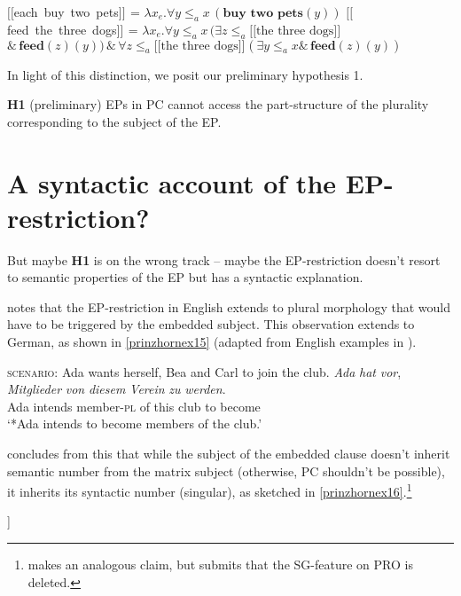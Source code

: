 \documentclass[output=paper,colorlinks,citecolor=brown,
]{langscibook}
\newcommand{\sem}[2]{\mbox{$[\![${#2}$]\!]^{#1}$}} %
\begin{document}
\ea	 
\ea \sem{}{each buy two pets} = $\lambda x_{e}. \forall y \le_{a} x \,(\textbf{buy two pets}(y))$\label{prinzhornex13a}
\ex	 \sem{}{feed the three dogs} = $\lambda x_{e}. \forall y \le_{a} x \,(\exists z \le_{a} \sem{}{the three dogs}$\\$ \&\,\textbf{feed}(z)(y)) \,\&\, \forall z \le_{a} \sem{}{the three dogs} (\exists y \le_{a} x \&\, \textbf{feed}(z)(y))$\label{prinzhornmy13}
\z\z

In light of this distinction, we posit our preliminary hypothesis 1.


\ea \textbf{H1} (preliminary) \quad EPs in PC cannot access the part-structure of the plurality corresponding to the subject of the EP.\label{prinzhornex14}
\z 




\section{A syntactic account of the EP-restriction?}\label{prinzhornsec:3}

But maybe \textbf{H1} is on the wrong track -- maybe the EP-restriction doesn't resort to semantic properties of the EP but has a syntactic explanation. 

\cite{Landau:2000} notes that the EP-restriction in English extends to plural morphology that would have to be triggered by  the embedded subject. This observation extends to German, as shown in \ref{prinzhornex15} (adapted from English examples in \citealt{Landau:2000}).


\ea \label{prinzhornex15}
\ea \textsc{scenario:} Ada wants herself, Bea and Carl to join the club.
\ex \gll *\textit{Ada} \textit{hat} \textit{vor}, \textit{Mitglieder} \textit{von} \textit{diesem} \textit{Verein} \textit{zu} \textit{werden}.\\
   Ada intends {}  member-\textsc{pl} of this club to become \\
   \glt `*Ada intends to become members of the club.' 
   \z\z



\cite{Landau:2000} concludes from this that while the subject of the embedded clause doesn't inherit semantic number from the matrix subject (otherwise, PC shouldn't be possible), it inherits its syntactic number (singular), as sketched in \ref{prinzhornex16}.\footnote{\cite{Pearson:2016} makes an analogous claim, but submits that the \textsc{SG}-feature on PRO is deleted. 
}

\ea [Ada$_{sg}$ plant [PRO$_{sg}$ Mitglieder von diesem Verein zu werden]]\label{prinzhornex16}
\z
\end{document}
